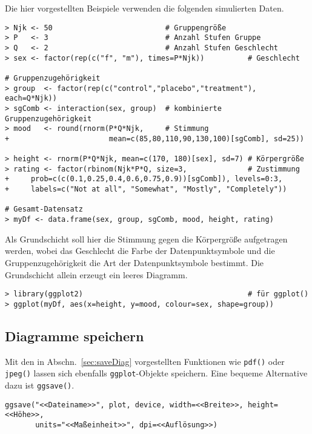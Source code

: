 Die hier vorgestellten Beispiele verwenden die folgenden simulierten Daten.
\begin{lstlisting}
> Njk <- 50                          # Gruppengröße
> P   <- 3                           # Anzahl Stufen Gruppe
> Q   <- 2                           # Anzahl Stufen Geschlecht
> sex <- factor(rep(c("f", "m"), times=P*Njk))          # Geschlecht

# Gruppenzugehörigkeit
> group  <- factor(rep(c("control","placebo","treatment"), each=Q*Njk))
> sgComb <- interaction(sex, group)  # kombinierte Gruppenzugehörigkeit
> mood   <- round(rnorm(P*Q*Njk,     # Stimmung
+                       mean=c(85,80,110,90,130,100)[sgComb], sd=25))

> height <- rnorm(P*Q*Njk, mean=c(170, 180)[sex], sd=7) # Körpergröße
> rating <- factor(rbinom(Njk*P*Q, size=3,              # Zustimmung
+     prob=c(c(0.1,0.25,0.4,0.6,0.75,0.9))[sgComb]), levels=0:3,
+     labels=c("Not at all", "Somewhat", "Mostly", "Completely"))

# Gesamt-Datensatz
> myDf <- data.frame(sex, group, sgComb, mood, height, rating)
\end{lstlisting}

Als Grundschicht soll hier die Stimmung gegen die Körpergröße aufgetragen werden, wobei das Geschlecht die Farbe der Datenpunktsymbole und die Gruppenzugehörigkeit die Art der Datenpunktsymbole bestimmt. Die Grundschicht allein erzeugt ein leeres Diagramm.
\begin{lstlisting}
> library(ggplot2)                                      # für ggplot()
> ggplot(myDf, aes(x=height, y=mood, colour=sex, shape=group))
\end{lstlisting}

\subsection{Diagramme speichern}

Mit den in Abschn.\ \ref{sec:saveDiag} vorgestellten Funktionen wie  \lstinline!pdf()! oder  \lstinline!jpeg()! lassen sich ebenfalls \lstinline!ggplot!-Objekte speichern. Eine bequeme Alternative dazu ist  \lstinline!ggsave()!.
\begin{lstlisting}
ggsave("<<Dateiname>>", plot, device, width=<<Breite>>, height=<<Höhe>>,
       units="<<Maßeinheit>>", dpi=<<Auflösung>>)
\end{lstlisting}

